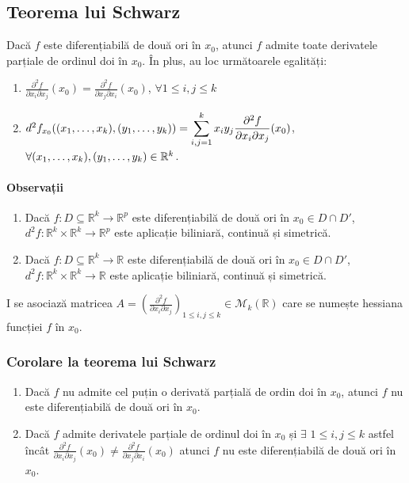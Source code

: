 \subsection{Teorema lui Schwarz}
Dacă $f$ este diferențiabilă de două ori în $x_{0}$, atunci $f$ admite toate derivatele parțiale de ordinul doi în $x_{0}$.
În plus, au loc următoarele egalități:
\begin{enumerate}[label=\emph{\alph*})]
    \item $\displaystyle\frac{\partial^{2} f}{\partial x_{i} \partial x_{j}}(x_{0}) = \displaystyle\frac{\partial^{2} f}{\partial x_{j} \partial x_{i}}(x_{0})$,
        $\forall 1 \leq i, j \leq k$
    \item $d^{2}f_{x_{0}}((x_{1}, \mathellipsis, x_{k}), (y_{1}, \mathellipsis, y_{k})) = \displaystyle\sum_{i,j=1}^{k}x_{i}y_{j} 
        \displaystyle\frac{\partial^{2} f}{\partial x_{i} \partial x_{j}}(x_{0})$, $\forall (x_{1}, \mathellipsis, x_{k}), (y_{1}, \mathellipsis, y_{k}) \in \mathbb{R}^{k}$.
\end{enumerate}

\paragraph{Observații}
\begin{enumerate}[label=\emph{\arabic*})]
    \item Dacă $f:D \subseteq \mathbb{R}^{k} \rightarrow \mathbb{R}^{p}$ este diferențiabilă de două ori în $x_{0} \in D \cap D'$, 
        $d^{2}f:\mathbb{R}^{k} \times \mathbb{R}^{k} \rightarrow \mathbb{R}^{p}$ este aplicație biliniară, continuă și simetrică.
    \item Dacă $f:D \subseteq \mathbb{R}^{k} \rightarrow \mathbb{R}$ este diferențiabilă de două ori în $x_{0} \in D \cap D'$, 
        $d^{2}f:\mathbb{R}^{k} \times \mathbb{R}^{k} \rightarrow \mathbb{R}$ este aplicație biliniară, continuă și simetrică.
\end{enumerate}
I se asociază matricea $A = \left( \displaystyle\frac{\partial^{2} f}{\partial x_{i} \partial x_{j}} \right)_{1 \leq i, j \leq k} \in \mathcal{M}_{k}(\mathbb{R})$
care se numește hessiana funcției $f$ în $x_{0}$.

\subsubsection{Corolare la teorema lui Schwarz}
\begin{enumerate}[label=\emph{\arabic*})]
    \item Dacă $f$ nu admite cel puțin o derivată parțială de ordin doi în $x_{0}$, atunci $f$ nu este diferențiabilă de două ori în $x_{0}$.
    \item Dacă $f$ admite derivatele parțiale de ordinul doi în $x_{0}$ și $\exists$ $1 \leq i, j \leq k$ astfel încât
        $\displaystyle\frac{\partial^{2} f}{\partial x_{i} \partial x_{j}}(x_{0}) \neq \displaystyle\frac{\partial^{2} f}{\partial x_{j} \partial x_{i}}(x_{0})$
        atunci $f$ nu este diferențiabilă de două ori în $x_{0}$.
\end{enumerate}

